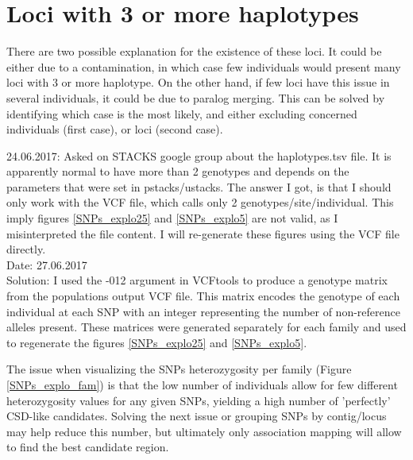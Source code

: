 \documentclass[10pt,a4paper]{report}
\begin{document}
\section{Loci with 3 or more haplotypes}

There are two possible explanation for the existence of these loci. It could be either due to a contamination, in which case few individuals would present many loci with 3 or more haplotype. On the other hand, if few loci have this issue in several individuals, it could be due to paralog merging. This can be solved by identifying which case is the most likely, and either excluding concerned individuals (first case), or loci (second case).

24.06.2017: Asked on STACKS google group about the haplotypes.tsv file. It is apparently normal to have more than 2 genotypes and depends on the parameters that were set in pstacks/ustacks. The answer I got, is that I should only work with the VCF file, which calls only 2 genotypes/site/individual. This imply figures \ref{SNPs_explo25} and \ref{SNPs_explo5} are not valid, as I misinterpreted the file content. I will re-generate these figures using the VCF file directly.
\\
Date: 27.06.2017
\\
Solution: I used the -012 argument in VCFtools to produce a genotype matrix from the populations output VCF file. This matrix encodes the genotype of each individual at each SNP with an integer representing the number of non-reference alleles present. These matrices were generated separately for each family and used to regenerate the figures \ref{SNPs_explo25} and \ref{SNPs_explo5}.

The issue when visualizing the SNPs heterozygosity per family (Figure \ref{SNPs_explo_fam}) is that the low number of individuals allow for few different heterozygosity values for any given SNPs, yielding a high number of 'perfectly' CSD-like candidates. Solving the next issue or grouping SNPs by contig/locus may help reduce this number, but ultimately only association mapping will allow to find the best candidate region. 
\end{document}
